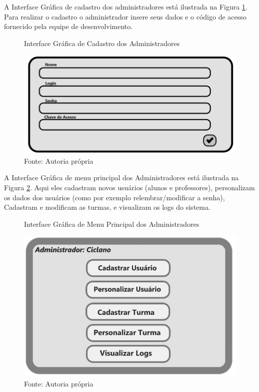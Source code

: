 \documentclass{utfpr-pg}
\begin{document}
    A Interface Gráfica de cadastro dos administradores está ilustrada na Figura \ref{fig:10}. Para realizar o cadastro o administrador insere seus dados e o código de acesso fornecido pela equipe de desenvolvimento.
    \begin{figure}[H]
            \centering
            \captionsetup{width=0.9\textwidth}
            \caption{Interface Gráfica de Cadastro dos Administradores}
            \includegraphics[width=\linewidth]{fotos/10.jpg}
            \caption*{Fonte: Autoria própria}
            \label{fig:10}
        \end{figure}
    A Interface Gráfica de menu principal dos Administradores está ilustrada na Figura \ref{fig:11}. Aqui eles cadastram novos usuários (alunos e professores), personalizam os dados dos usuários (como por exemplo relembrar/modificar a senha), Cadastram e modificam as turmas, e visualizam os logs do sistema.
     \begin{figure}[H]
            \centering
            \captionsetup{width=0.9\textwidth}
            \caption{Interface Gráfica de Menu Principal dos Administradores}
            \includegraphics[width=\linewidth]{fotos/11.jpg}
            \caption*{Fonte: Autoria própria}
            \label{fig:11}
        \end{figure}
    
\end{document}
